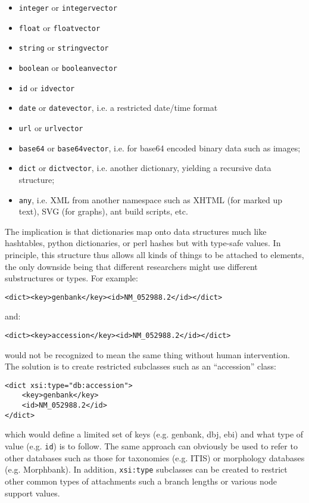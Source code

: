 \documentclass{article}
\newcommand{\code}{\texttt} \usepackage{fullpage}
\begin{document}
\begin{itemize}

\item \code{integer} or \code{integervector}

\item \code{float} or \code{floatvector}

\item \code{string} or \code{stringvector}

\item \code{boolean} or \code{booleanvector}

\item \code{id} or \code{idvector}

\item \code{date} or \code{datevector}, i.e. a restricted date/time
format

\item \code{url} or \code{urlvector}

\item \code{base64} or \code{base64vector}, i.e. for base64 encoded
binary data such as images;

\item \code{dict} or \code{dictvector}, i.e. another dictionary,
yielding a recursive data structure;

\item \code{any}, i.e. XML from another namespace such as XHTML (for
marked up text), SVG (for graphs), ant build scripts, etc.

\end{itemize}

The implication is that dictionaries map onto data structures much like
hashtables, python dictionaries, or perl hashes but with type-safe
values. In principle, this structure thus allows all kinds of things to
be attached to elements, the only downside being that different
researchers might use different substructures or types. For example:
\begin{verbatim}<dict><key>genbank</key><id>NM_052988.2</id></dict>\end{verbatim} 
and: 
\begin{verbatim}<dict><key>accession</key><id>NM_052988.2</id></dict>\end{verbatim}
would not be recognized to mean the same thing without human
intervention. The solution is to create restricted subclasses such as an
``accession'' class: 
\begin{verbatim} 
<dict xsi:type="db:accession">
    <key>genbank</key>
    <id>NM_052988.2</id>
</dict>
\end{verbatim} which would define a limited set of keys (e.g. genbank,
dbj, ebi) and what type of value (e.g. \code{id}) is to follow. The same
approach can obviously be used to refer to other databases such as those
for taxonomies (e.g. ITIS) or morphology databases (e.g. Morphbank). In
addition, \code{xsi:type} subclasses can be created to restrict other
common types of attachments such a branch lengths or various node
support values.
\end{document}
